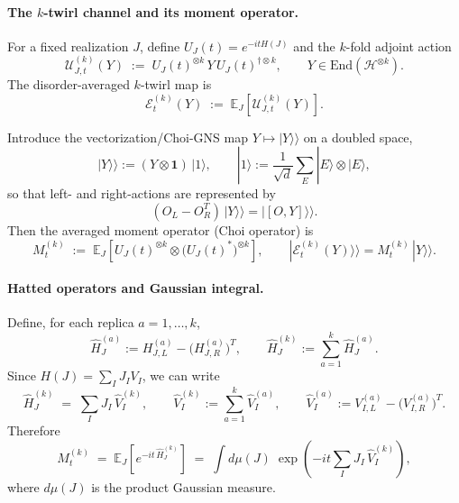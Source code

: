 \documentclass{article}
\theoremstyle{definition}
\begin{document}
    \paragraph{The $k$-twirl channel and its moment operator.}
    For a fixed realization $J$, define $U_{J}(t)=e^{-itH(J)}$ and the $k$-fold
    adjoint action
    \begin{equation}
        \mathcal{U}^{(k)}_{J,t}(Y)\;:=\;U_{J}(t)^{\otimes k}\,Y\,U_{J}(t)^{\dagger\otimes
        k}, \qquad Y\in \mathrm{End}(\mathcal{H}^{\otimes k}).
    \end{equation}
    The disorder-averaged $k$-twirl map is
    \begin{equation}
        \mathcal{E}^{(k)}_{t}(Y)\;:=\;\mathbb{E}_{J}\!\left[\mathcal{U}^{(k)}_{J,t}
        (Y)\right].
    \end{equation}

    Introduce the vectorization/Choi-GNS map $Y\mapsto |Y\rangle\rangle$ on a doubled
    space,
    \begin{equation}
        |Y\rangle\rangle := (Y\otimes \mathbf{1})\,|1\rangle, \qquad |1\rangle :=
        \frac{1}{\sqrt{d}}\sum_{E}|E\rangle\otimes |E\rangle,
    \end{equation}
    so that left- and right-actions are represented by
    \begin{equation}
        (O_{L}- O_{R}^{T})\,|Y\rangle\rangle = |[O,Y]\rangle\rangle.
    \end{equation}
    Then the averaged moment operator (Choi operator) is
    \begin{equation}
        M_{t}^{(k)}\;:=\;\mathbb{E}_{J}\!\left[U_{J}(t)^{\otimes k}\otimes \big(U
        _{J}(t)^{*}\big)^{\otimes k}\right], \qquad |\mathcal{E}_{t}^{(k)}(Y)\rangle
        \rangle = M_{t}^{(k)}\,|Y\rangle\rangle.
    \end{equation}

    \paragraph{Hatted operators and Gaussian integral.}
    Define, for each replica $a=1,\dots,k$,
    \begin{equation}
        \widehat H_{J}^{(a)}:= H_{J,L}^{(a)}- \big(H_{J,R}^{(a)}\big)^{T}, \qquad
        \widehat H_{J}^{(k)}:= \sum_{a=1}^{k}\widehat H_{J}^{(a)}.
    \end{equation}
    Since $H(J)=\sum_{I}J_{I}V_{I}$, we can write
    \begin{equation}
        \widehat H_{J}^{(k)}\;=\; \sum_{I}J_{I}\,\widehat V_{I}^{(k)}, \qquad \widehat
        V_{I}^{(k)}:= \sum_{a=1}^{k}\widehat V_{I}^{(a)}, \qquad \widehat V_{I}^{(a)}
        := V_{I,L}^{(a)}- \big(V_{I,R}^{(a)}\big)^{T}.
    \end{equation}
    Therefore
    \begin{equation}
        M_{t}^{(k)}\;=\; \mathbb{E}_{J}\!\left[e^{-it\,\widehat H_J^{(k)}}\right]
        \;=\;\int d\mu(J)\;\exp\!\left(-it\sum_{I}J_{I}\,\widehat V_{I}^{(k)}\right
        ), \label{eq:Mt_as_gaussian_integral}
    \end{equation}
    where $d\mu(J)$ is the product Gaussian measure.
\end{document}
